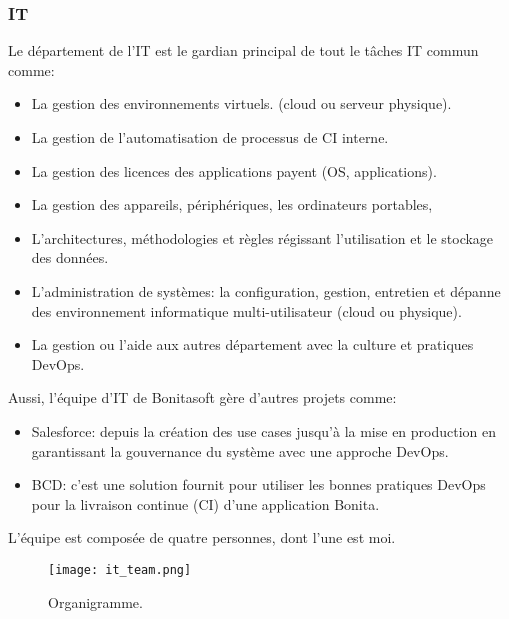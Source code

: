 \subsubsection{IT}
Le département de l'IT est le gardian principal de tout le tâches IT commun comme:
\begin{itemize}
  \item La gestion des environnements virtuels. (cloud ou serveur physique).
  \item La gestion de l'automatisation de processus de CI interne.
  \item La gestion des licences des applications payent (OS, applications).
  \item La gestion des appareils, périphériques, les ordinateurs portables,
  \item L'architectures, méthodologies et règles régissant l'utilisation et le stockage des données.
  \item L'administration de systèmes: la configuration, gestion, entretien et dépanne des environnement
  informatique multi-utilisateur (cloud ou physique).
  \item  La gestion ou l'aide aux autres département avec la culture et pratiques DevOps.
\end{itemize}

Aussi, l'équipe d'IT de Bonitasoft gère d'autres projets comme:
\begin{itemize}
  \item Salesforce: depuis la création des use cases jusqu'à la mise en production en garantissant la gouvernance du système avec une approche DevOps.
  \item BCD: c'est une solution fournit pour utiliser les bonnes pratiques DevOps pour la livraison continue (CI) d'une application Bonita.
\end{itemize}

L'équipe est composée de quatre personnes, dont l'une est moi.

\begin{figure}[h]
  \texttt{[image: it\_team.png]}
   \caption{Organigramme.}
   \label{figure:organigrame}
\end{figure}
